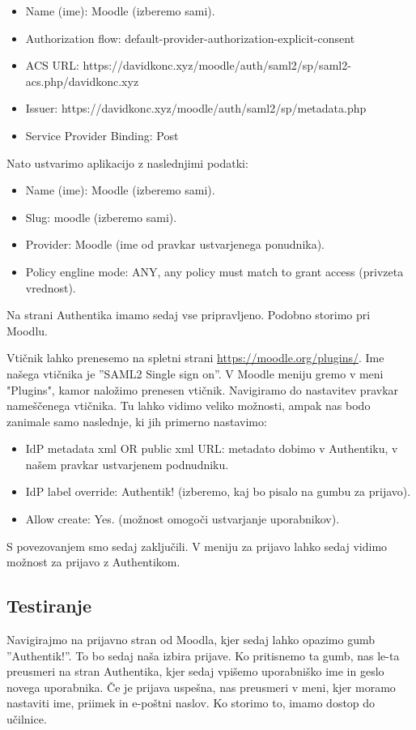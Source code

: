 \documentclass[a4paper,12pt,openright,oneside]{book}
\begin{document}
\begin{itemize}
    \item Name (ime): Moodle (izberemo sami).
    \item Authorization flow: default-provider-authorization-explicit-consent
    \item ACS URL: https://davidkonc.xyz/moodle/auth/saml2/sp/saml2-acs.php/davidkonc.xyz
    \item Issuer: https://davidkonc.xyz/moodle/auth/saml2/sp/metadata.php
    \item Service Provider Binding:  Post
\end{itemize}

Nato ustvarimo aplikacijo z naslednjimi podatki:
\begin{itemize}
    \item Name (ime): Moodle (izberemo sami).
    \item Slug: moodle (izberemo sami).
    \item Provider: Moodle (ime od pravkar ustvarjenega ponudnika).
    \item Policy engline mode: ANY, any policy must match to grant access (privzeta vrednost). 
\end{itemize}

Na strani Authentika imamo sedaj vse pripravljeno. Podobno storimo pri Moodlu. 

Vtičnik lahko prenesemo na spletni strani \href{https://moodle.org/plugins/}{https://moodle.org/plugins/}. Ime našega vtičnika je ''SAML2 Single sign on''. V Moodle meniju gremo v meni "Plugins", kamor naložimo prenesen vtičnik. 
Navigiramo do nastavitev pravkar nameščenega vtičnika. Tu lahko vidimo veliko možnosti, ampak nas bodo zanimale samo naslednje, ki jih primerno nastavimo:
\begin{itemize}
    \item IdP metadata xml OR public xml URL: metadato dobimo v Authentiku, v našem pravkar ustvarjenem podnudniku.
    \item IdP label override: Authentik! (izberemo, kaj bo pisalo na gumbu za prijavo).
    \item Allow create: Yes. (možnost omogoči ustvarjanje uporabnikov).
\end{itemize}
S povezovanjem smo sedaj zaključili. V meniju za prijavo lahko sedaj vidimo možnost za prijavo z Authentikom.
\subsection{Testiranje}
Navigirajmo na prijavno stran od Moodla, kjer sedaj lahko opazimo gumb ''Authentik!''. To bo sedaj naša izbira prijave. Ko pritisnemo ta gumb, nas le-ta preusmeri na stran Authentika, kjer sedaj vpišemo uporabniško ime in geslo novega uporabnika. Če je prijava uspešna, nas preusmeri v meni, kjer moramo nastaviti ime, priimek in e-poštni naslov. Ko storimo to, imamo dostop do učilnice. 
\end{document}
